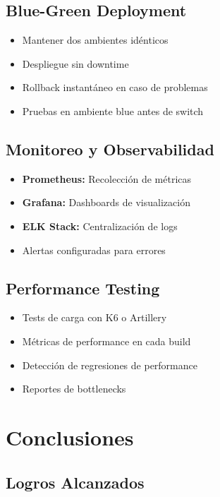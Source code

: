 \documentclass[12pt,a4paper]{article}
\begin{document}
\subsection{Blue-Green Deployment}

\begin{itemize}
    \item Mantener dos ambientes idénticos
    \item Despliegue sin downtime
    \item Rollback instantáneo en caso de problemas
    \item Pruebas en ambiente blue antes de switch
\end{itemize}

\subsection{Monitoreo y Observabilidad}

\begin{itemize}
    \item \textbf{Prometheus:} Recolección de métricas
    \item \textbf{Grafana:} Dashboards de visualización
    \item \textbf{ELK Stack:} Centralización de logs
    \item Alertas configuradas para errores
\end{itemize}

\subsection{Performance Testing}

\begin{itemize}
    \item Tests de carga con K6 o Artillery
    \item Métricas de performance en cada build
    \item Detección de regresiones de performance
    \item Reportes de bottlenecks
\end{itemize}

\newpage

\section{Conclusiones}

\subsection{Logros Alcanzados}
\end{document}

